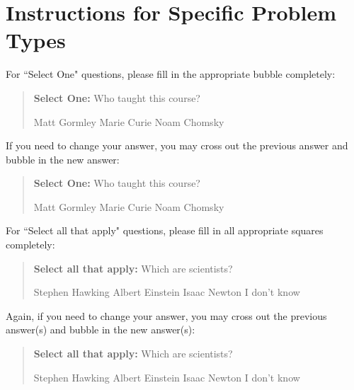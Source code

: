 \documentclass[11pt,addpoints,answers]{exam}
\newcommand{\blackcircle}{\tikz\draw[black,fill=black] (0,0) circle (1ex);}
\begin{document}
\begin{itemize}
\end{itemize}\clearpage

\section*{Instructions for Specific Problem Types}

For ``Select One" questions, please fill in the appropriate bubble completely:

\begin{quote}
\textbf{Select One:} Who taught this course?
    \begin{checkboxes}
     \CorrectChoice Matt Gormley
     \choice Marie Curie
     \choice Noam Chomsky
    \end{checkboxes}
\end{quote}

If you need to change your answer, you may cross out the previous answer and bubble in the new answer:

\begin{quote}
\textbf{Select One:} Who taught this course?
    {
    \begin{checkboxes}
     \CorrectChoice Matt Gormley
     \choice Marie Curie \checkboxchar{\xcancel{\blackcircle}{}}
     \choice Noam Chomsky
    \end{checkboxes}
    }
\end{quote}

For ``Select all that apply" questions, please fill in all appropriate squares completely:

\begin{quote}
\textbf{Select all that apply:} Which are scientists?
    {%
    \checkboxchar{$\Box$} \checkedchar{$\blacksquare$} %
    \begin{checkboxes}
    \CorrectChoice Stephen Hawking 
    \CorrectChoice Albert Einstein
    \CorrectChoice Isaac Newton
    \choice I don't know
    \end{checkboxes}
    }
\end{quote}

Again, if you need to change your answer, you may cross out the previous answer(s) and bubble in the new answer(s):

\begin{quote}
\textbf{Select all that apply:} Which are scientists?
    {%
    \checkboxchar{\xcancel{$\blacksquare$}} \checkedchar{$\blacksquare$} %
    \begin{checkboxes}
    \CorrectChoice Stephen Hawking 
    \CorrectChoice Albert Einstein
    \CorrectChoice Isaac Newton
    \choice I don't know
    \end{checkboxes}
    }
\end{quote}
\end{document}
